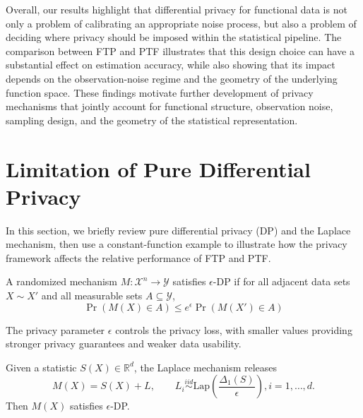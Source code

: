 \documentclass[twoside,11pt]{article}
\begin{document}
Overall, our results highlight that differential privacy for functional data is not only a problem of calibrating an appropriate noise process, but also a problem of deciding where privacy should be imposed within the statistical pipeline. The comparison between FTP and PTF illustrates that this design choice can have a substantial effect on estimation accuracy, while also showing that its impact depends on the observation-noise regime and the geometry of the underlying function space. These findings motivate further development of privacy mechanisms that jointly account for functional structure, observation noise, sampling design, and the geometry of the statistical representation.



\newpage

\appendix
\section{Limitation of Pure Differential Privacy}
In this section, we briefly review pure differential privacy (DP) and the Laplace mechanism, then use a constant-function example to illustrate how the privacy framework affects the relative performance of FTP and PTF.

\begin{definition}
A randomized mechanism 
$M:\mathcal{X}^n\to \mathcal{Y}$ satisfies $\epsilon$-DP if for all adjacent data sets $X\sim X'$ and all measurable sets $A\subseteq \mathcal{Y}$,
\[
\Pr(M(X)\in A)
\le
e^\epsilon \Pr(M(X')\in A)
\]
\end{definition}

The privacy parameter $\epsilon$ controls the privacy loss, with smaller values providing stronger privacy guarantees and weaker data usability.
\begin{proposition}
    Given a statistic $S(X)\in \mathbb{R}^d$, the Laplace mechanism releases
    \[
    M(X)=S(X)+L,\qquad
    L_i \overset{iid}{\sim} \mathrm{Lap}\left(\frac{\Delta_1(S)}{\epsilon}\right), i=1,\ldots,d.
    \]
    Then $M(X)$ satisfies $\epsilon$-DP.
\end{proposition}
\end{document}

